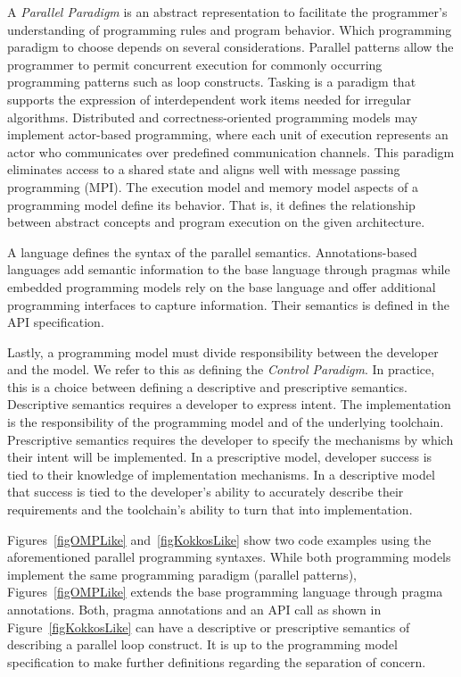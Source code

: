 A \emph{Parallel Paradigm} is an abstract representation to facilitate the programmer's understanding of programming rules and program behavior. Which programming paradigm to choose depends on several considerations. Parallel patterns allow the programmer to permit concurrent execution for commonly occurring programming patterns such as loop constructs. Tasking is a paradigm that supports the expression of interdependent work items needed for irregular algorithms. Distributed and correctness-oriented programming models may implement actor-based programming, where each unit of execution represents an actor who communicates over predefined communication channels. This paradigm eliminates access to a shared state and aligns well with message passing programming (MPI). The execution model and memory model aspects of a programming model define its behavior. That is, it defines the relationship between abstract concepts and program execution on the given architecture.

A language defines the syntax of the parallel semantics. Annotations-based languages add semantic information to the base language through pragmas while embedded programming models rely on the base language and offer additional programming interfaces to capture information. Their semantics is defined in the API specification. 

Lastly, a programming model must divide responsibility between the developer and the model. We refer to this as defining the \emph{Control Paradigm}. In practice, this is a choice between defining a descriptive and prescriptive semantics. Descriptive semantics requires a developer to express intent. The implementation is the responsibility of the programming model and of the underlying toolchain. Prescriptive semantics requires the developer to specify the mechanisms by which their intent will be implemented. In a prescriptive model, developer success is tied to their knowledge of implementation mechanisms. In a descriptive model that success is tied to the developer's ability to accurately describe their requirements and the toolchain's ability to turn that into implementation. 

Figures~\ref{figOMPLike} and~\ref{figKokkosLike} show two code examples using the aforementioned parallel programming syntaxes. While both programming models implement the same programming paradigm (parallel patterns), Figures~\ref{figOMPLike} extends the base programming language through pragma annotations. Both, pragma annotations and an API call as shown in Figure~\ref{figKokkosLike} can have a descriptive or prescriptive semantics of describing a parallel loop construct. It is up to the programming model specification to make further definitions regarding the separation of concern.

